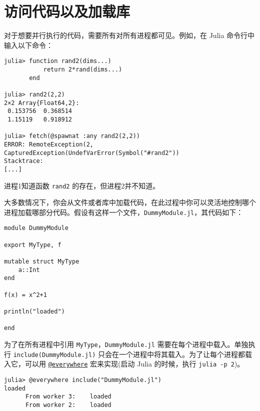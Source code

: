 \hypertarget{8031006575124915656}{}


\section{访问代码以及加载库}



对于想要并行执行的代码，需要所有对所有进程都可见。例如，在 Julia 命令行中输入以下命令：




\begin{verbatim}
julia> function rand2(dims...)
           return 2*rand(dims...)
       end

julia> rand2(2,2)
2×2 Array{Float64,2}:
 0.153756  0.368514
 1.15119   0.918912

julia> fetch(@spawnat :any rand2(2,2))
ERROR: RemoteException(2, CapturedException(UndefVarError(Symbol("#rand2"))
Stacktrace:
[...]
\end{verbatim}



进程1知道函数 \texttt{rand2} 的存在，但进程2并不知道。



大多数情况下，你会从文件或者库中加载代码，在此过程中你可以灵活地控制哪个进程加载哪部分代码。假设有这样一个文件，\texttt{DummyModule.jl}，其代码如下：




\begin{verbatim}
module DummyModule

export MyType, f

mutable struct MyType
    a::Int
end

f(x) = x^2+1

println("loaded")

end
\end{verbatim}



为了在所有进程中引用 \texttt{MyType}，\texttt{DummyModule.jl} 需要在每个进程中载入。单独执行 \texttt{include({\textquotedbl}DummyModule.jl{\textquotedbl})} 只会在一个进程中将其载入。为了让每个进程都载入它，可以用 \hyperlink{4972064255482407966}{\texttt{@everywhere}} 宏来实现(启动 Julia 的时候，执行 \texttt{julia -p 2})。




\begin{verbatim}
julia> @everywhere include("DummyModule.jl")
loaded
      From worker 3:    loaded
      From worker 2:    loaded
\end{verbatim}



